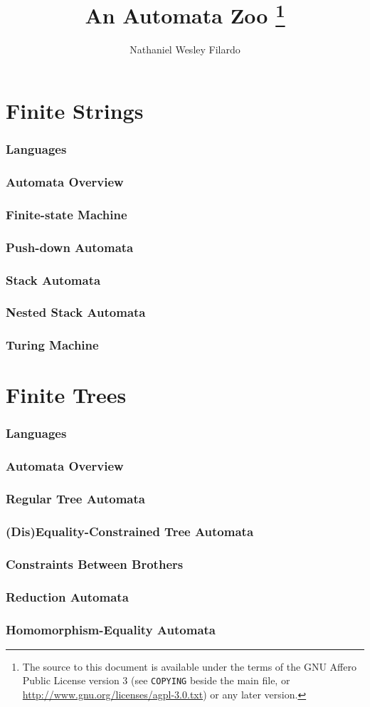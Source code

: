 \documentclass[letterpaper]{article}
\title{An Automata Zoo%
%
\footnote{The source to this document is available under the terms of the
GNU Affero Public License version 3 (see {\tt COPYING} beside the main file,
or \url{http://www.gnu.org/licenses/agpl-3.0.txt}) or any later version.}}
\author{Nathaniel Wesley Filardo}
\newcommand{\maininclude}[2]{\section{#1} \label{sec:#2} }
\begin{document}
\maketitle


\part{Finite Strings}
\maininclude{Languages}{strlang}
\maininclude{Automata Overview}{strautintro}
\maininclude{Finite-state Machine}{zoo-str/fsm}
\maininclude{Push-down Automata}{zoo-str/pda}
\maininclude{Stack Automata}{zoo-str/stack}
\maininclude{Nested Stack Automata}{zoo-str/nested-stack}
\maininclude{Turing Machine}{zoo-str/tm}


\part{Finite Trees}
\maininclude{Languages}{treelang}
\maininclude{Automata Overview}{treeautintro}
\maininclude{Regular Tree Automata}{zoo-tree/regular}
\maininclude{(Dis)Equality-Constrained Tree Automata}{zoo-tree/awedc}
\maininclude{Constraints Between Brothers}{zoo-tree/awcbb}
\maininclude{Reduction Automata}{zoo-tree/ra}
\maininclude{Homomorphism-Equality Automata}{zoo-tree/tahom}


\appendix


\glsaddall
\printglossaries
\end{document}
